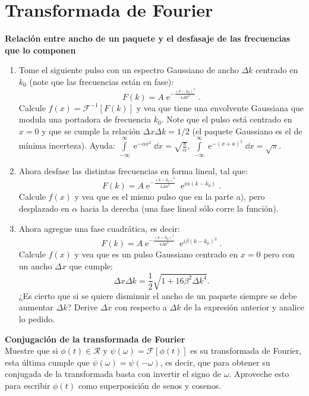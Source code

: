 \section*{Transformada de Fourier}

\item 
\textbf{Relación entre ancho de un paquete y el desfasaje de las frecuencias que lo componen}
\begin{enumerate}
	\item Tome el siguiente pulso con un espectro Gaussiano de ancho $\Delta k$ centrado en $k_0$ (note que las frecuencias están en fase):
$$
F(k)=A \operatorname{e}^{-\frac{ ( k - k_0 )^2 }{ 4 \Delta k^2 } }.
$$
Calcule $f(x) = \mathcal{F}^{-1}[F(k)]$ y vea que tiene una envolvente Gaussiana que modula una portadora de frecuencia $k_{0}$.
Note que el pulso está centrado en $x=0$ y que se cumple la relación $\Delta x \Delta k = 1/2$ (el paquete Gaussiano es el de mínima incerteza).
Ayuda: \( \int\limits_{-\infty}^{\infty} \operatorname{e}^{-\alpha x^2} \dd{x} = \sqrt{\frac{\pi}{\alpha} } \), \( \int\limits_{-\infty}^{\infty} \operatorname{e}^{-(x+ a)^2} \dd{x} = \sqrt{\pi}\).
	\item Ahora desfase las distintas frecuencias en forma lineal, tal que:
$$
F(k)=A \operatorname{e}^{ -\frac{ ( k - k_0 )^2 }{ 4 \Delta k^2 } } \operatorname{e}^{ i \alpha (k - k_0 ) }.
$$
Calcule $f(x)$ y vea que es el mismo pulso que en la parte a), pero desplazado en $\alpha$ hacia la derecha (una fase lineal sólo corre la función).
	\item Ahora agregue una fase cuadrática, es decir:
$$
F(k) = A \operatorname{e}^{-\frac{(k-k_{0})^{2}}{4\Delta k^{2}} } \operatorname{e}^{i \beta ( k - k_0 )^2 }.
$$
Calcule $f(x)$ y vea que es un pulso Gaussiano centrado en $x=0$ pero con un ancho $\Delta x$ que cumple:
$$
\Delta x \Delta k = \frac{1}{2} \sqrt{ 1 + 16 \beta^2 \Delta k^4 }.
$$
¿Es cierto que si se quiere disminuir el ancho de un paquete siempre se debe aumentar $\Delta k$?
Derive $\Delta x$ con respecto a $\Delta k$ de la expresión anterior y analice lo pedido.
\end{enumerate}



\item \textbf{Conjugación de la transformada de Fourier}\\
Muestre que si $\phi(t) \in \mathcal{R}$ y $\psi(\omega)= \mathcal{F} \left[ \phi (t) \right]$ es su transformada de Fourier, esta última cumple que \( \overline{\psi}(\omega) = \psi(- \omega) \), es decir, que para obtener su conjugada de la transformada basta con invertir el signo de $\omega$.
Aproveche esto para escribir $\phi(t)$ como superposición de senos y cosenos.
